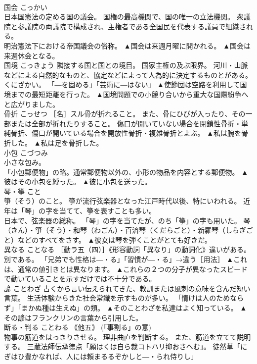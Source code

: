 \documentclass[8pt]{extreport}
\begin{document}
\begin{CJK}{UTF8}{min}
\\	国会	こっかい	
\\	日本国憲法の定める国の議会。 国権の最高機関で、国の唯一の立法機関。 衆議院と参議院の両議院で構成され、主権者である全国民を代表する議員で組織される。 
\\	明治憲法下における帝国議会の俗称。	▲国会は来週月曜に開かれる。 ▲国会は来週休会となる。
\\	国境	こっきょう	隣接する国と国との境目。 国家主権の及ぶ限界。 河川・山脈などによる自然的なものと、協定などによって人為的に決定するものとがある。 くにざかい。 「―を固める」「芸術に―はない」	▲使節団は空路を利用して国境までの最短距離を行った。 ▲国境問題での小競り合いから重大な国際紛争へと広がりました。
\\	骨折	こっせつ	［名］スル骨が折れること。 また、骨にひびが入ったり、その一部または全部が折れたりすること。 傷口が開いていない場合を閉鎖性骨折・単純骨折、傷口が開いている場合を開放性骨折・複雑骨折とよぶ。	▲私は腕を骨折した。 ▲私は足を骨折した。
\\	小包	こづつみ	
\\	小さな包み。 
\\	「小包郵便物」の略。通常郵便物以外の、小形の物品を内容とする郵便物。	▲彼はその小包を縛った。 ▲彼に小包を送った。
\\	琴・箏	こと	
\\	箏（そう）のこと。 箏が流行弦楽器となった江戸時代以後、特にいわれる。 近年は「琴」の字を当てて、箏を表すことも多い。 
\\	日本で、弦楽器の総称。 「琴」の字を当てたが、のち「箏」の字も用いた。 琴（きん）・箏（そう）・和琴（わごん）・百済琴（くだらごと）・新羅琴（しらぎごと）などのすべてをさす。	▲彼女は琴を弾くことがとても好きだ。
\\	異なる	ことなる	［動ラ五（四）］《形容動詞「異なり」の動詞化》違いがある。 別である。 「兄弟でも性格は―・る」「習慣が―・る」→違う［用法］	▲これは、通常の値引きとは異なります。 ▲これらの２つの分子が異なったスピードで動いていることを示すだけでは不十分である。
\\	諺	ことわざ	古くから言い伝えられてきた、教訓または風刺の意味を含んだ短い言葉。 生活体験からきた社会常識を示すものが多い。 「情けは人のためならず」「まかぬ種は生えぬ」の類。	▲そのことわざを私達はよく知っている。 ▲その諺はフランクリンの言葉から引用した。
\\	断る・判る	ことわる	｟他五｠ (「事割る」の意) 
\\	物事の筋道をはっきりさせる。 理非曲直を判断する。 また、筋道を立てて説明する。 三蔵法師伝承徳点「願はくは自ら裁コトハリ抑おさへむ」。 徒然草「にぎはひ豊かなれば、人には頼まるるぞかしと―・られ侍りし」 

\end{CJK}
\end{document}
